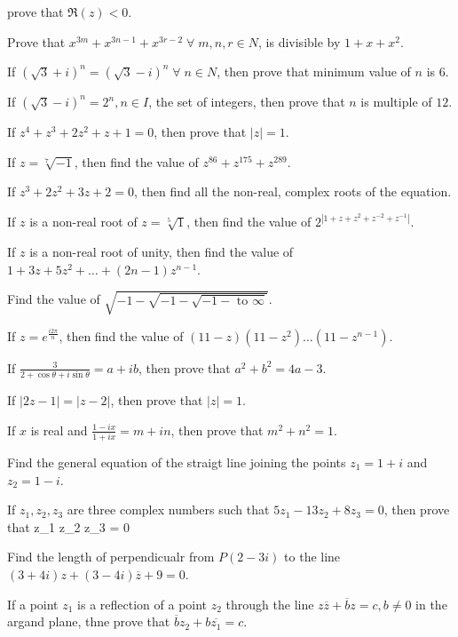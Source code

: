   prove that $\Re(z) < 0$.
\item Prove that $x^{3m} + x^{3n - 1} + x^{3r - 2}\;\forall\;m,n,r\in N$, is divisible by $1 + x + x^2$.
\item If $(\sqrt{3} + i)^n = (\sqrt{3} - i)^n\;\forall\;n\in N$, then prove that minimum value of $n$ is $6$.
\item If $(\sqrt{3} - i)^n = 2^n, n\in I$, the set of integers, then prove that $n$ is multiple of $12$.
\item If $z^4 + z^3 + 2z^2 + z + 1 = 0$, then prove that $|z| = 1$.
\item If $z = \sqrt[7]{-1}$, then find the value of $z^{86} + z^{175} + z^{289}$.
\item If $z^3 + 2z^2 + 3z + 2 = 0$, then find all the non-real, complex roots of the equation.
\item If $z$ is a non-real root of $z = \sqrt[5]{1}$, then find the value of $2^{|1 + z + z^2 + z^{-2} + z^{-1}|}$.
\item If $z$ is a non-real root of unity, then find the value of $1 + 3z + 5z^2 + \ldots + (2n - 1)z^{n - 1}$.
\item Find the value of $\sqrt{-1 - \sqrt{-1 - \sqrt{-1 - \text{~to~} \infty}}}$.
\item If $z = e^{\frac{i2\pi}{n}}$, then find the value of $(11 - z)(11 - z^2)\ldots(11 - z^{n - 1})$.
\item If $\frac{3}{2 + \cos\theta + i\sin\theta} = a + ib$, then prove that $a^2 + b^2 = 4a - 3$.
\item If $|2z - 1| = |z - 2|$, then prove that $|z| = 1$.
\item If $x$ is real and $\frac{1 - ix}{1 + ix} = m + in$, then prove that $m^2 + n^2 = 1$.
\item Find the general equation of the straigt line joining the points $z_1 = 1 + i$ and $z_2 = 1 - i$.
\item If $z_1, z_2, z_3$ are three complex numbers such that $5z_1 - 13z_2 + 8z_3 = 0$, then prove that \startformula \startdeterminant \NC z_1 \NC
   \NR\NC z_2 \NC {} \NR\NC z_3 \NC {} \NR\stopdeterminant = 0\stopformula
\item Find the length of perpendicualr from $P(2 - 3i)$ to the line $(3 + 4i)z + (3 - 4i)\overline{z} + 9 = 0$.
\item If a point $z_1$ is a reflection of a point $z_2$ through the line $z\overline{z} + \overline{b}z = c, b\neq 0$ in the argand
  plane, thne prove that $\overline{b}z_2 + b\overline{z_1} = c$.

